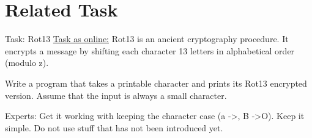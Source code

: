\section{Related Task}
\begin{frame}{Task: Rot13}
	\href{http://fsr.github.io/c-lessons/exercises/02_rot_13.html}{Task as online:} \newline
    Rot13 is an ancient cryptography procedure. 
    It encrypts a message by shifting each character 13 letters in alphabetical order (modulo z).\newline

    Write a program that takes a printable character and prints its Rot13 encrypted version. 
    Assume that the input is always a small character. \newline

    Experts: Get it working with keeping the character case (a -\textgreater, B -\textgreater O). 
    Keep it simple. Do not use stuff that has not been introduced yet.

\end{frame}


